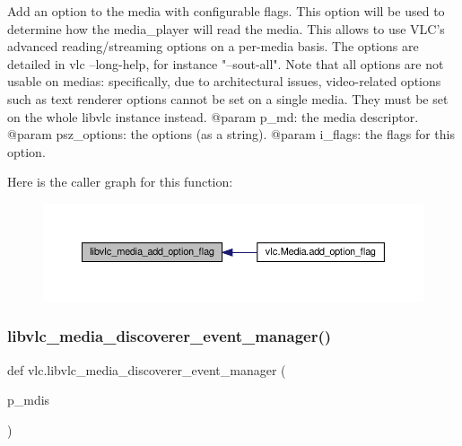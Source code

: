 \begin{DoxyVerb}Add an option to the media with configurable flags.
This option will be used to determine how the media_player will
read the media. This allows to use VLC's advanced
reading/streaming options on a per-media basis.
The options are detailed in vlc --long-help, for instance
"--sout-all". Note that all options are not usable on medias:
specifically, due to architectural issues, video-related options
such as text renderer options cannot be set on a single media. They
must be set on the whole libvlc instance instead.
@param p_md: the media descriptor.
@param psz_options: the options (as a string).
@param i_flags: the flags for this option.
\end{DoxyVerb}
 Here is the caller graph for this function\+:
\nopagebreak
\begin{figure}[H]
\begin{center}
\leavevmode
\includegraphics[width=350pt]{namespacevlc_a7dc1f3fd16f555dec3a3bf5466c86d5f_icgraph}
\end{center}
\end{figure}
\mbox{\label{namespacevlc_ae17b8e9a27594920a38298179a0198e6}} 
\subsubsection{\texorpdfstring{libvlc\+\_\+media\+\_\+discoverer\+\_\+event\+\_\+manager()}{libvlc\_media\_discoverer\_event\_manager()}}
{\footnotesize\ttfamily def vlc.\+libvlc\+\_\+media\+\_\+discoverer\+\_\+event\+\_\+manager (\begin{DoxyParamCaption}\item[{}]{p\+\_\+mdis }\end{DoxyParamCaption})}

